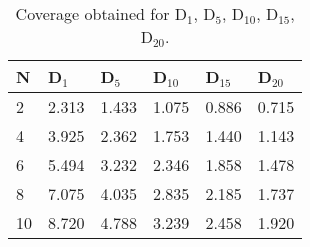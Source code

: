 \begin{table}[t!]
	\small
	\caption{Coverage obtained for D$_{1}$, D$_{5}$, D$_{10}$, D$_{15}$, D$_{20}$.}
	\begin{tabular}{|p{1.00cm}|p{0.95cm}|p{0.95cm}|p{0.95cm}|p{0.95cm}|p{0.95cm}|} \hline
\textbf{N} & \textbf{ D$_{1}$} & \textbf{D$_{5}$} & \textbf{ D$_{10}$} & \textbf{D$_{15}$} & \textbf{D$_{20}$} \\ \hline
		2                & 2.313                                                                    & 1.433                                                                    & 1.075                                                                     & 0.886                                                                     & 0.715                                                                     \\ \hline
		4                & 3.925                                                                    & 2.362                                                                    & 1.753                                                                     & 1.440                                                                     & 1.143                                                                     \\ \hline
		6                & 5.494                                                                    & 3.232                                                                    & 2.346                                                                     & 1.858                                                                     & 1.478                                                                     \\ \hline
		8                & 7.075                                                                    & 4.035                                                                    & 2.835                                                                     & 2.185                                                                     & 1.737                                                                     \\ \hline
		10               & 8.720                                                                    & 4.788                                                                    & 3.239                                                                     & 2.458                                                                     & 1.920                                                                     \\ \hline

\end{tabular}
\end{table}
